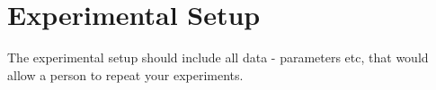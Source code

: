 \section{Experimental Setup}

The experimental setup should include all data - parameters etc, that would allow a person to repeat your experiments. 

